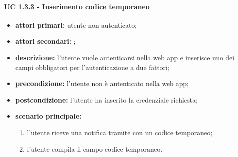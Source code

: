 			\paragraph{UC 1.3.3 - Inserimento codice temporaneo}
			\begin{itemize}
				\item \textbf{attori primari:} utente non autenticato;
				\item \textbf{attori secondari:} ;
				\item \textbf{descrizione:} l'utente vuole autenticarsi nella web app e inserisce uno dei campi obbligatori per l'autenticazione a due fattori;
				\item \textbf{precondizione:} l'utente non è autenticato nella web app;
				\item \textbf{postcondizione:} l'utente ha inserito la credenziale richiesta;
				\item \textbf{scenario principale:}
				\begin{enumerate}
					\item l'utente riceve una notifica tramite  con un codice temporaneo;
					\item l'utente compila il campo codice temporaneo.
				\end{enumerate}
			\end{itemize}
